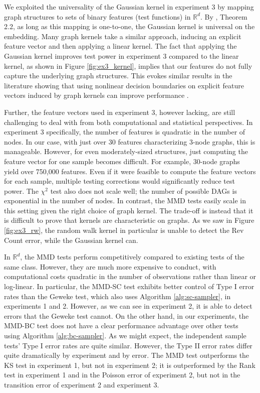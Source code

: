 \documentclass[a4paper,11pt]{article}
\begin{document}
We exploited the universality of the Gaussian kernel in experiment 3 by mapping graph structures to sets of binary features (test functions) in $\mathbb{R}^{d}$. By \cite{christmann_universal_2010}, Theorem 2.2, as long as this mapping is one-to-one, the Gaussian kernel is universal on the embedding. Many graph kernels take a similar approach, inducing an explicit feature vector and then applying a linear kernel. The fact that applying the Gaussian kernel improves test power in experiment 3 compared to the linear kernel, as shown in Figure \ref{fig:ex3_kernel}, implies that our features do not fully capture the underlying graph structures. This evokes similar results in the literature showing that using nonlinear decision boundaries on explicit feature vectors induced by graph kernels can improve performance \cite{kriege_survey_2020}. 

Further, the feature vectors used in experiment 3, however lacking, are still challenging to deal with from both computational and statistical perspectives. In experiment 3 specifically, the number of features is quadratic in the number of nodes. In our case, with just over 30 features characterizing 3-node graphs, this is manageable. However, for even moderately-sized structures, just computing the feature vector for one sample becomes difficult. For example, 30-node graphs yield over 750,000 features. Even if it were feasible to compute the feature vectors for each sample, multiple testing corrections would significantly reduce test power. The $\chi^{2}$ test also does not scale well; the number of possible DAGs is exponential in the number of nodes. In contrast, the MMD tests easily scale in this setting given the right choice of graph kernel. The trade-off is instead that it is difficult to prove that kernels are characteristic on graphs. As we saw in Figure \ref{fig:ex3_rw}, the random walk kernel in particular is unable to detect the Rev Count error, while the Gaussian kernel can.

In $\mathbb{R}^{d}$, the MMD tests perform competitively compared to existing tests of the same class. However, they are much more expensive to conduct, with computational costs quadratic in the number of observations rather than linear or log-linear. In particular, the MMD-SC test exhibits better control of Type I error rates than the Geweke test, which also uses Algorithm \ref{alg:sc-sampler}, in experiments 1 and 2. However, as we can see in experiment 2, it is able to detect errors that the Geweke test cannot. On the other hand, in our experiments, the MMD-BC test does not have a clear performance advantage over other tests using Algorithm \ref{alg:bc-sampler}. As we might expect, the independent sample tests' Type I error rates are quite similar. However, the Type II error rates differ quite dramatically by experiment and by error. The MMD test outperforms the KS test in experiment 1, but not in experiment 2; it is outperformed by the Rank test in experiment 1 and in the Poisson error of experiment 2, but not in the transition error of experiment 2 and experiment 3. 
\end{document}
